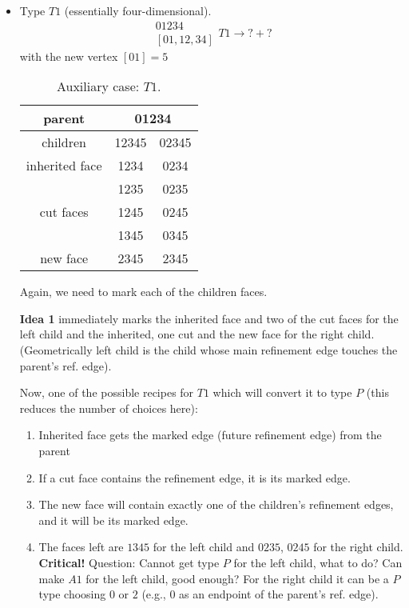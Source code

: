 \documentclass[a4paper,12pt]{amsart}
\numberwithin{equation}{section}
\begin{document}
\begin{itemize}
	
	\item Type $T1$ (essentially four-dimensional).
	$$ \begin{array}{c} 01234 \\ \left[01,12,34\right] \end{array} T1
	\rightarrow ? + ? $$
	with the new vertex $\left[01\right] = 5$
	\begin{table}[h!]
	\caption{Auxiliary case: $T1$.}
	\label{tab:Case4}
	\begin{tabular}{|c|c|c|} \hline
	parent & \multicolumn{2}{|c|}{01234} \\ \hline
	children & 12345 & 02345 \\ \hline
	inherited face & 1234 & 0234 \\ \hline
	\multirow{3}{*}{cut faces} & 1235 & 0235 \\ 
	 & 1245 & 0245 \\ 
	 & 1345 & 0345 \\ \hline
	 new face & 2345 & 2345 \\ \hline
	\end{tabular}
	\end{table}    
    Again, we need to mark each of the children faces. 
    
    \textbf{Idea 1} immediately marks the inherited face and two of the cut faces for the left child and the inherited, one cut and the new face for the right child. (Geometrically left child is the child whose main refinement edge touches the parent's ref. edge).
    
    Now, one of the possible recipes for $T1$ which will convert it to type $P$ (this reduces the number of choices here):
    	\begin{enumerate}
		\item Inherited face gets the marked edge (future refinement edge) from the parent
		\item If a cut face contains the refinement edge, it is its marked edge.
		\item The new face will contain exactly one of the children's refinement edges, and it will be its marked edge.
		\item The faces left are $1345$ for the left child and $0235$, $0245$ for the right child. 
		\textbf{Critical!} Question: Cannot get type $P$ for the left child, what to do? Can make $A1$ for the left child, good enough? For the right child it can be a $P$ type choosing $0$ or $2$ (e.g., $0$ as an endpoint of the parent's ref. edge).
	\end{enumerate}
	

\end{itemize}
\end{document}

